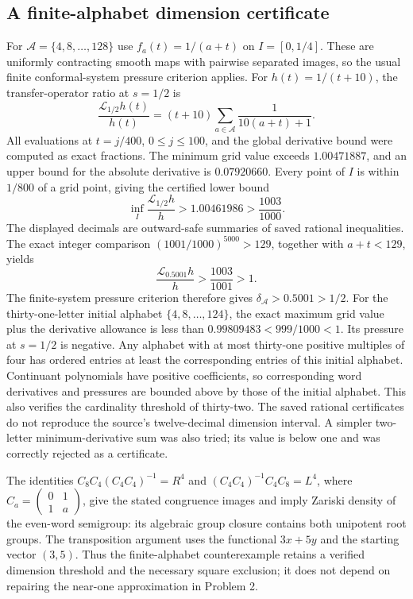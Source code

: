 \documentclass[10pt]{article}
\begin{document}
\subsection*{A finite-alphabet dimension certificate}
For \(\mathcal A=\{4,8,\ldots,128\}\) use \(f_a(t)=1/(a+t)\) on \(I=[0,1/4]\). These are uniformly contracting smooth maps with pairwise separated images, so the usual finite conformal-system pressure criterion applies. For \(h(t)=1/(t+10)\), the transfer-operator ratio at \(s=1/2\) is \[\frac{\mathcal L_{1/2}h(t)}{h(t)}
   =(t+10)\sum_{a\in\mathcal A}\frac1{10(a+t)+1}.
 \tag{2.2}\] All evaluations at \(t=j/400\), \(0\leq j\leq100\), and the global derivative bound were computed as exact fractions. The minimum grid value exceeds \(1.00471887\), and an upper bound for the absolute derivative is \(0.07920660\). Every point of \(I\) is within \(1/800\) of a grid point, giving the certified lower bound \[\inf_I\frac{\mathcal L_{1/2}h}{h}
       >1.00461986>\frac{1003}{1000}.\] The displayed decimals are outward-safe summaries of saved rational inequalities. The exact integer comparison \((1001/1000)^{5000}>129\), together with \(a+t<129\), yields \[\frac{\mathcal L_{0.5001}h}{h}
   >\frac{1003}{1001}>1.\] The finite-system pressure criterion therefore gives \(\delta_{\mathcal A}>0.5001>1/2\). For the thirty-one-letter initial alphabet \(\{4,8,\ldots,124\}\), the exact maximum grid value plus the derivative allowance is less than \(0.99809483<999/1000<1\). Its pressure at \(s=1/2\) is negative. Any alphabet with at most thirty-one positive multiples of four has ordered entries at least the corresponding entries of this initial alphabet. Continuant polynomials have positive coefficients, so corresponding word derivatives and pressures are bounded above by those of the initial alphabet. This also verifies the cardinality threshold of thirty-two. The saved rational certificates do not reproduce the source’s twelve-decimal dimension interval. A simpler two-letter minimum-derivative sum was also tried; its value is below one and was correctly rejected as a certificate.\par
The identities \(C_8C_4(C_4C_4)^{-1}=R^4\) and \((C_4C_4)^{-1}C_4C_8=L^4\), where \(C_a=\left(\begin{smallmatrix}0&1\\1&a\end{smallmatrix}\right)\), give the stated congruence images and imply Zariski density of the even-word semigroup: its algebraic group closure contains both unipotent root groups. The transposition argument uses the functional \(3x+5y\) and the starting vector \((3,5)\). Thus the finite-alphabet counterexample retains a verified dimension threshold and the necessary square exclusion; it does not depend on repairing the near-one approximation in Problem 2.\par
\end{document}
